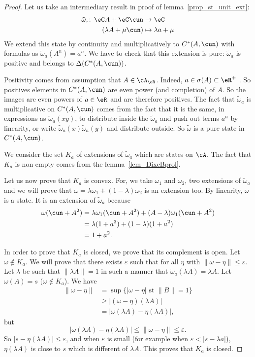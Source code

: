 \begin{proof}
	Let us take an intermediary result in proof of lemma~\ref{prop_st_unit_ext}:
	\begin{equation}
		\begin{aligned}
			\tilde\omega,:\,\eC A+\eC\cun & \to \eC               \\
			(\lambda A+\mu\cun)           & \mapsto \lambda a+\mu
		\end{aligned}
	\end{equation}
	We extend this state by continuity and multiplicatively to $C^*(A,\cun)$ with formulas as $\tilde\omega_a(A^n)=a^n$. We have to check that this extension is pure: $\tilde\omega_a$ is positive and belongs to $\Delta(C^*(A,\cun))$.

	Positivity comes from assumption that $A\in\cA_{\eR}$. Indeed, $a\in\sigma(A)\subset\eR^+$ . So positives elements in $C^*(A,\cun)$ are even power (and completion) of $A$. So the images are even powers of  $a\in\eR$ and are therefore positives.
	The fact that $\tilde\omega_a$ is multiplicative on $C^*(A,\cun)$ comes from the fact that it is the same, in expressions as
	$\tilde\omega_a(xy)$, to distribute inside the $\tilde\omega_a$ and push out terms $a^n$ by linearity, or write $\tilde\omega_a(x)\tilde\omega_a(y)$ and distribute outside. So $\tilde\omega$ is a pure state in $C^*(A,\cun)$.

	We consider the set $K_a$ of extensions of $\tilde\omega_a$ which are states on $\cA$. The fact that $K_a$ is non empty comes from the lemma~\ref{lem_DixcBprol}.

	Let us now prove that $K_a$ is convex. For, we take $\omega_1$ and $\omega_2$, two extensions of $\tilde\omega_a$ and we will prove that $\omega=\lambda\omega_1+(1-\lambda)\omega_2$ is an extension too. By linearity, $\omega$ is a state. It is an extension of $\tilde\omega_a$ because
	\[
		\begin{split}
			\omega(\cun+A^2)&=\lambda\omega_1(\cun+A^2)+(A-\lambda)\omega_1(\cun+A^2)\\
			&=\lambda(1+a^2)+(1-\lambda)(1+a^2)\\
			&=1+a^2.
		\end{split}
	\]

	In order to prove that $K_a$ is closed, we prove that its complement is open. Let $\omega\notin K_a$. We will prove that there exists $\varepsilon$ such that for all $\eta$ with $\| \omega-\eta \|\leq\varepsilon$. Let $\lambda$ be such that $\| \lambda A \|=1$ in such a manner that $\tilde\omega_a(\lambda A)=\lambda A$. Let $\omega(A)=s$ ($\omega\notin K_a$). We have
	\[
		\begin{split}
			\| \omega-\eta \|&=\sup\{ | \omega-\eta |\text{ st } \| B \|=1 \}\\
			&\geq | (\omega-\eta)(\lambda A) |\\
			&=| \omega(\lambda A)-\eta(\lambda A) |,
		\end{split}
	\]
	but
	\[
		| \omega(\lambda A)-\eta(\lambda A) |\leq \| \omega-\eta \|\leq\varepsilon.
	\]
	So $| s-\eta(\lambda A) |\leq \varepsilon$, and when $\varepsilon$ is small (for example when $\varepsilon<| s-\lambda a |$), $\eta(\lambda A)$ is close to $s$ which is different of $\lambda A$. This proves that $K_a$ is closed.


\end{proof}

